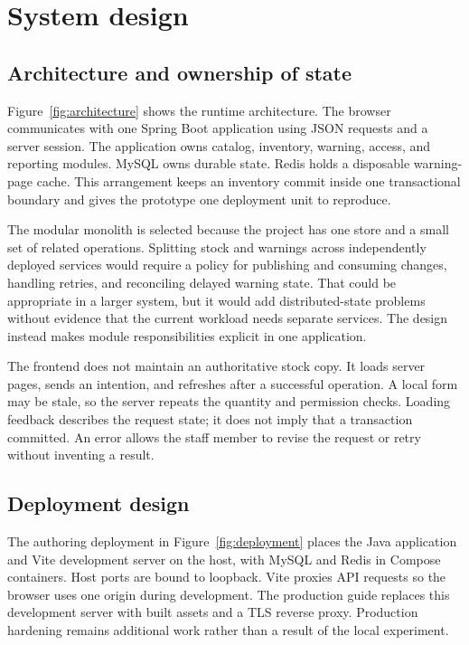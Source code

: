 \chapter{System design}\label{ch:design}
\section{Architecture and ownership of state}
Figure~\ref{fig:architecture} shows the runtime architecture. The browser communicates with one Spring Boot application using JSON requests and a server session. The application owns catalog, inventory, warning, access, and reporting modules. MySQL owns durable state. Redis holds a disposable warning-page cache. This arrangement keeps an inventory commit inside one transactional boundary and gives the prototype one deployment unit to reproduce.


The modular monolith is selected because the project has one store and a small set of related operations. Splitting stock and warnings across independently deployed services would require a policy for publishing and consuming changes, handling retries, and reconciling delayed warning state. That could be appropriate in a larger system, but it would add distributed-state problems without evidence that the current workload needs separate services. The design instead makes module responsibilities explicit in one application.

The frontend does not maintain an authoritative stock copy. It loads server pages, sends an intention, and refreshes after a successful operation. A local form may be stale, so the server repeats the quantity and permission checks. Loading feedback describes the request state; it does not imply that a transaction committed. An error allows the staff member to revise the request or retry without inventing a result.

\section{Deployment design}
The authoring deployment in Figure~\ref{fig:deployment} places the Java application and Vite development server on the host, with MySQL and Redis in Compose containers. Host ports are bound to loopback. Vite proxies API requests so the browser uses one origin during development. The production guide replaces this development server with built assets and a TLS reverse proxy. Production hardening remains additional work rather than a result of the local experiment.

